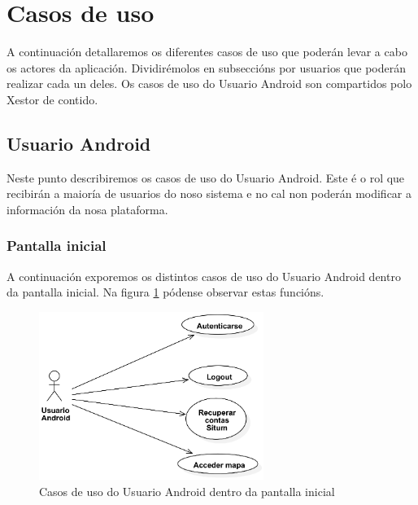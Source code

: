 \section{Casos de uso}

A continuación detallaremos os diferentes casos de uso que poderán levar a cabo os actores da aplicación. Dividirémolos en subseccións por usuarios que poderán realizar cada un deles. Os casos de uso do Usuario Android son compartidos polo Xestor de contido.

\subsection{Usuario Android}

Neste punto describiremos os casos de uso do Usuario Android. Este é o rol que recibirán a maioría de usuarios do noso sistema e no cal non poderán modificar a información da nosa plataforma.

\subsubsection{Pantalla inicial}
A continuación exporemos os distintos casos de uso do Usuario Android dentro da pantalla inicial. Na figura \ref{fig:cuUsuarioAndroidPantallaInicial} pódense observar estas funcións.

\begin{figure}[tb] 
	\begin{center}
		\includegraphics[width=0.65\textwidth]{figures/CasosUso/UsuarioAndroidPantallaInicial}
		\caption{Casos de uso do Usuario Android dentro da pantalla inicial}
		\label{fig:cuUsuarioAndroidPantallaInicial}
	\end{center}
\end{figure}

